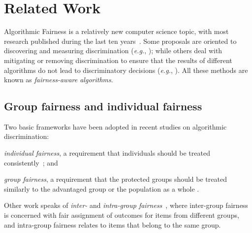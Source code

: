 \section{Related Work}\label{sec:related-work}

Algorithmic Fairness is a relatively new computer science topic, with most research published during the last ten years~\cite{tuto2016,rosenbaum2019algorithmic}. Some proposals are oriented to discovering and measuring discrimination ({\em e.g.}, \cite{peder2008,Bonchi2015,angwin_2016_machine}); while others deal with mitigating or removing discrimination to ensure that the results of different algorithms do not lead to discriminatory decisions
({\em e.g.}, \cite{CaldersICDM,HajianFerrer12,hajian2014,Dwork2012,Zemel2013}).
%
All these methods are known as \emph{fairness-aware algorithms}.

\subsection{Group fairness and individual fairness}
Two basic frameworks have been adopted in recent studies on algorithmic discrimination: \begin{inparaenum}[(i)]
	\item \emph{individual fairness}, a requirement that individuals should be treated consistently~\cite{Dwork2012, zliobaite2015survey}; and
	\item \emph{group fairness}, a requirement that the protected groups should be treated similarly to the advantaged group or the population as a whole \cite{peder2008,pederruggi2009}.
\end{inparaenum}
%
Other work speaks of \emph{inter-} and \emph{intra-group fairness}~\cite{grgic2017fairness, yeom2021avoiding, beutel2019fairness}, where inter-group fairness is concerned with fair assignment of outcomes for items from different groups, and intra-group fairness relates to items that belong to the same group.
%

